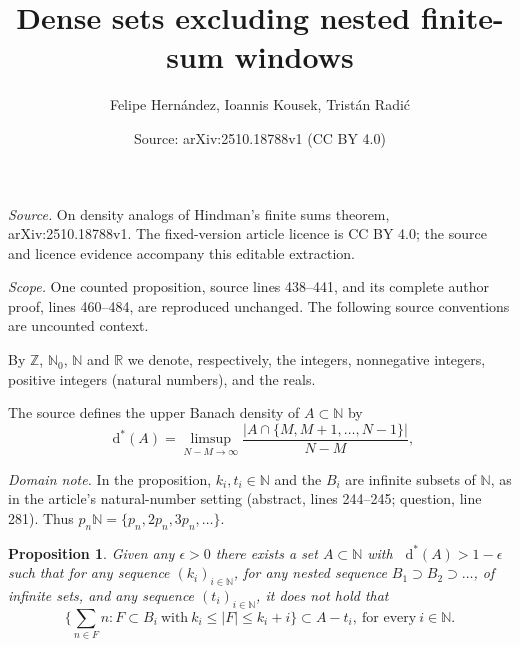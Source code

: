 \documentclass[10pt,a4paper]{amsart}
\title[Dense sets excluding nested finite-sum windows]{Dense sets excluding nested finite-sum windows}
\author[Hern\'andez, Kousek and Radi\'c]{Felipe Hern\'andez, Ioannis Kousek, Trist\'an Radi\'c}
\date{Source: arXiv:2510.18788v1 (CC BY 4.0)}
\newtheorem{prop}{Proposition}
\newcommand*\diff{\mathop{}\!\mathrm{d}}
\newcommand{\N}{\mathbb{N}}
\newcommand{\Z}{\mathbb{Z}}
\newcommand{\R}{\mathbb{R}}
\begin{document}
\maketitle
\noindent\emph{Source.} On density analogs of Hindman's finite sums theorem,
arXiv:2510.18788v1. The fixed-version article licence is CC BY 4.0;
the source and licence evidence accompany this editable extraction.
\par\smallskip
\noindent\emph{Scope.} One counted proposition, source lines 438--441,
and its complete author proof, lines 460--484, are reproduced unchanged.
The following source conventions are uncounted context.
\par\smallskip
By $\Z$, $\N_0$, $\N$ and $\R$ we denote, respectively, the integers,
nonnegative integers, positive integers (natural numbers), and the reals. 

\par\smallskip
\noindent The source defines the upper Banach density of $A\subset\N$ by
\begin{equation*}
    \diff^{*}(A)=\limsup_{N-M\to \infty}\frac{|A\cap \{M,M+1,\ldots,N-1\}|}{N-M},
\end{equation*}

\noindent\emph{Domain note.} In the proposition, $k_i,t_i\in\N$ and
the $B_i$ are infinite subsets of $\N$, as in the article's natural-number
setting (abstract, lines 244--245; question, line 281).
Thus $p_n\N=\{p_n,2p_n,3p_n,\ldots\}$.
\par\medskip
\begin{prop}\label{1.2 is optimal (ii)}
Given any $\epsilon>0$ there exists a set $A\subset \N$ with $\diff^*(A)>1-\epsilon$ such that for any sequence $(k_i)_{i \in \N}$, for any nested sequence $B_1\supset B_2 \supset \ldots$, of infinite sets, and any sequence $(t_i)_{i\in \N}$, it does not hold that
$$\bigg\{\sum_{n\in F}n: F\subset B_i\ \text{with}\ k_i\leq |F|\leq k_i+i \bigg\}\subset A-t_i,\ \text{for every}\ i\in \N.$$
\end{prop}
\end{document}
